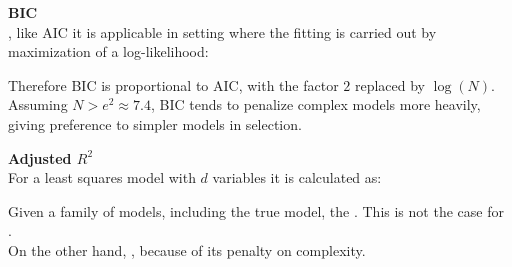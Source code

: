 \textbf{BIC}\\
, like AIC it is applicable in setting where the 
fitting is carried out by maximization of a log-likelihood:
\begin{center}
\end{center}
Therefore BIC is proportional to AIC, with the factor $2$ replaced by $\log(N)$. Assuming 
$N>e^{2}\approx 7.4$, BIC tends to penalize complex models more heavily, giving preference to 
simpler models in selection.

\textbf{Adjusted $R^{2}$}\\
For a least squares model with $d$ variables it is calculated as:
\begin{center}
\end{center}

Given a family of models, including the true model, the . This is not the case for
.\\
On the other hand, , because of
its penalty on complexity.

